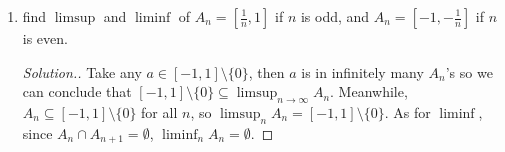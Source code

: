\documentclass[12pt]{article}
\begin{document}
\begin{enumerate}
\begin{itemize}
\begin{proof}[Solution.]
						\begin{equation*}
							\mu(0,r) = \lim_{n \to \infty} \mu(A_n) = \lim_{n \to \infty} \mu(0,q_n] = c \cdot \lim_{n \to \infty} q_n = cr
						\end{equation*}
						as $q_n \to r$. 
						By translation invariance, we have any interval $(a,b]$ in the reals where $a<b$ has measure, $\mu(a,b]= \mu(0,b-a] = c(b-a)$. It's straightforward to see that $\mu = c\lambda$ on the algebra $\Sigma_0$ as defined in question \ref{q:5}, which is trivially a $\pi$ system, thus they agree on $\mathcal{B}(0,1]$
					\end{proof}
			\end{itemize}
			\item find $\limsup$ and $\liminf$ of $A_n = [\frac{1}{n}, 1]$ if $n$ is odd, and $A_n = [-1,-\frac{1}{n}]$ if $n$ is even. 
			\begin{proof}[Solution.]
				Take any $a \in [-1,1]\setminus\{0\}$, then $a$ is in infinitely many $A_n$'s so we can conclude that $[-1,1]\setminus\{0\} \subseteq \limsup_{n \to \infty} A_n$. Meanwhile, $A_n \subseteq [-1,1]\setminus\{0\}$ for all $n$, so $\limsup_n A_n = [-1,1]\setminus\{0\}$. As for $\liminf$, since $A_n \cap A_{n+1} = \emptyset$, $\liminf_n A_n = \emptyset$. 
			\end{proof}
			

\end{enumerate}
\end{document}
